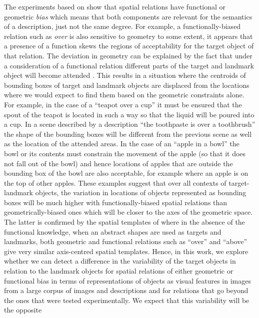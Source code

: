 The experiments based on \cite{CoventryEtAl:2001} show that spatial
relations have functional or geometric \emph{bias} which means that
both components are relevant for the semantics of a description, just
not the same degree. For example, a functionally-biased relation such
as \emph{over} is also sensitive to geometry to some extent, it
appears that a presence of a function skews the regions of
acceptability for the target object of that relation. The deviation in
geometry can be explained by the fact that under a consideration of a
functional relation different parts of the target and landmark object
will become attended \cite{Coventry:2005aa,Carlson:2006aa}. This
results in a situation where the centroids of bounding boxes of target
and landmark objects are displaced from the locations where we would
expect to find them based on the geometric constraints alone. For
example, in the case of a ``teapot over a cup'' it must be ensured
that the spout of the teapot is located in such a way so that the
liquid will be poured into a cup. In a scene described by a
description ``the toothpaste is over a toothbrush'' the shape of the
bounding boxes will be different from the previous scene as well as
the location of the attended areas. In the case of an ``apple in a
bowl'' the bowl or its contents must constrain the movement of the
apple (so that it does not fall out of the bowl) and hence locations
of apples that are outside the bounding box of the bowl are also
acceptable, for example where an apple is on the top of other
apples. These examples suggest that over all contexts of
target-landmark objects, the variation in locations of objects
represented as bounding boxes will be much higher with
functionally-biased spatial relations than geometrically-biased ones
which will be closer to the axes of the geometric space. The latter is
confirmed by the spatial templates of \cite{logan1996computational} where in
the absence of the functional knowledge, when an abstract shapes are
used as targets and landmarks, both geometric and functional relations
such as ``over'' and ``above'' give very similar axis-centred spatial
templates.  Hence, in this work, we explore whether we can detect a
difference in the variability of the target objects in relation to the
landmark objects for spatial relations of either geometric or
functional bias in terms of representations of objects as visual
features in images from a large corpus of images and descriptions and
for relations that go beyond the ones that were tested
experimentally. We expect that this variability will be the opposite
